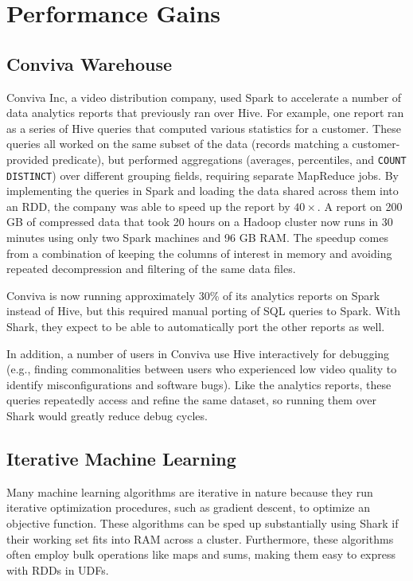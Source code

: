 \documentclass[preprint]{acm_proc_article-sp}
\begin{document}
\section{Performance Gains}

\subsection{Conviva Warehouse}
Conviva Inc, a video distribution company, used Spark to accelerate a number of data analytics reports that previously ran over Hive. For example, one report ran as a series of Hive queries that computed various statistics for a customer. These queries all worked on the same subset of the data (records matching a customer-provided predicate), but performed aggregations (averages, percentiles, and {\small\tt COUNT DISTINCT}) over different grouping fields, requiring separate MapReduce jobs. By implementing the queries in Spark and loading the data shared across them into an RDD, the company was able to speed up the report by $40\times$. A report on 200 GB of compressed data that took 20 hours on a Hadoop cluster now runs in 30 minutes using only two Spark machines and 96 GB RAM. The speedup comes from a combination of keeping the columns of interest in memory and avoiding repeated decompression and filtering of the same data files.

Conviva is now running approximately 30\% of its analytics reports on Spark instead of Hive, but this required manual porting of SQL queries to Spark. With Shark, they expect to be able to automatically port the other reports as well.

In addition, a number of users in Conviva use Hive interactively for debugging (e.g., finding commonalities between users who experienced low video quality to identify misconfigurations and software bugs). Like the analytics reports, these queries repeatedly access and refine the same dataset, so running them over Shark would greatly reduce debug cycles.

\subsection{Iterative Machine Learning}

Many machine learning algorithms are iterative in nature because they run iterative optimization procedures, such as gradient descent, to optimize an objective function. These algorithms can be sped up substantially using Shark if their working set fits into RAM across a cluster. Furthermore, these algorithms often employ bulk operations like maps and sums, making them easy to express with RDDs in UDFs.
\end{document}

